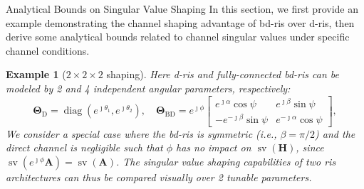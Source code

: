 \documentclass[journal]{IEEEtran}
\DeclareMathOperator{\diag}{diag}
\DeclareMathOperator{\sv}{sv}
\newtheorem{example}{Example}
\begin{document}
\begin{section}{Analytical Bounds on Singular Value Shaping}
	\label{sc:singular_value}
	In this section, we first provide an example demonstrating the channel shaping advantage of \gls{bd}-\gls{ris} over \gls{d}-\gls{ris}, then derive some analytical bounds related to channel singular values under specific channel conditions.

	\begin{example}[$2 \times 2 \times 2$ shaping]\label{eg:d_vs_bd}
		Here \gls{d}-\gls{ris} and fully-connected \gls{bd}-\gls{ris} can be modeled by 2 and 4 independent angular parameters, respectively:
		\begin{equation*}
			\mathbf{\Theta}_\mathrm{D} = \diag(e^{\jmath \theta_1}, e^{\jmath \theta_2}), \quad
			\mathbf{\Theta}_\mathrm{BD} = e^{\jmath \phi} \begin{bmatrix}
				e^{\jmath \alpha} \cos \psi  & e^{\jmath \beta} \sin \psi   \\
				-e^{-\jmath \beta} \sin \psi & e^{-\jmath \alpha} \cos \psi
			\end{bmatrix},
		\end{equation*}
		We consider a special case where the \gls{bd}-\gls{ris} is symmetric (i.e., $\beta = \pi / 2$) and the direct channel is negligible such that $\phi$ has no impact on $\sv(\mathbf{H})$, since $\sv(e^{\jmath \phi} \mathbf{A}) = \sv(\mathbf{A})$.
		The singular value shaping capabilities of two \gls{ris} architectures can thus be compared visually over 2 tunable parameters.
		\begin{figure}
			\centering

\end{figure}
\end{example}
\end{section}
\end{document}
